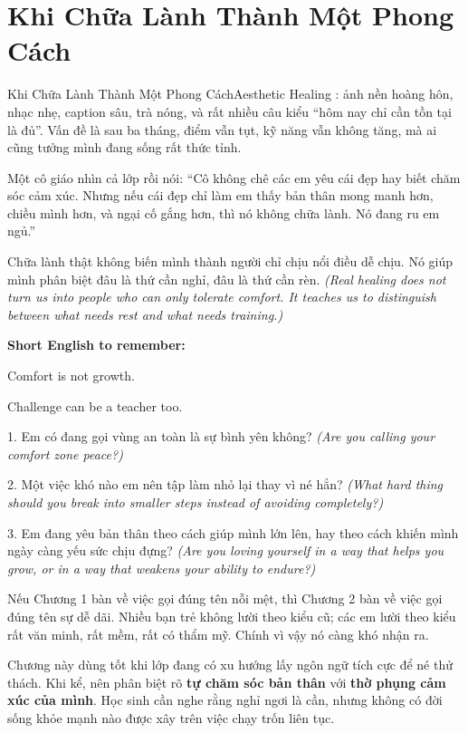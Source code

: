 \section{Khi Chữa Lành Thành Một Phong Cách}
\begin{truyen}{Khi Chữa Lành Thành Một Phong Cách}{Aesthetic Healing}
: ảnh nền hoàng hôn, nhạc nhẹ, caption sâu, trà nóng, và rất nhiều câu kiểu ``hôm nay chỉ cần tồn tại là đủ''. Vấn đề là sau ba tháng, điểm vẫn tụt, kỹ năng vẫn không tăng, mà ai cũng tưởng mình đang sống rất thức tỉnh.

Một cô giáo nhìn cả lớp rồi nói: ``Cô không chê các em yêu cái đẹp hay biết chăm sóc cảm xúc. Nhưng nếu cái đẹp chỉ làm em thấy bản thân mong manh hơn, chiều mình hơn, và ngại cố gắng hơn, thì nó không chữa lành. Nó đang ru em ngủ.''
\end{truyen}

\begin{baihoc}
Chữa lành thật không biến mình thành người chỉ chịu nổi điều dễ chịu. Nó giúp mình phân biệt đâu là thứ cần nghỉ, đâu là thứ cần rèn.
\textit{(Real healing does not turn us into people who can only tolerate comfort. It teaches us to distinguish between what needs rest and what needs training.)}
\end{baihoc}

\begin{ghinhoanh}
\textbf{Short English to remember:}

Comfort is not growth.

Challenge can be a teacher too.
\end{ghinhoanh}

\begin{tuhocnhanh}
1. Em có đang gọi vùng an toàn là sự bình yên không? \textit{(Are you calling your comfort zone peace?)}

2. Một việc khó nào em nên tập làm nhỏ lại thay vì né hẳn? \textit{(What hard thing should you break into smaller steps instead of avoiding completely?)}

3. Em đang yêu bản thân theo cách giúp mình lớn lên, hay theo cách khiến mình ngày càng yếu sức chịu đựng? \textit{(Are you loving yourself in a way that helps you grow, or in a way that weakens your ability to endure?)}
\end{tuhocnhanh}

\begin{tongketchuong}
Nếu Chương 1 bàn về việc gọi đúng tên nỗi mệt, thì Chương 2 bàn về việc gọi đúng tên sự dễ dãi. Nhiều bạn trẻ không lười theo kiểu cũ; các em lười theo kiểu rất văn minh, rất mềm, rất có thẩm mỹ. Chính vì vậy nó càng khó nhận ra.
\end{tongketchuong}

\begin{goigiaovien}
Chương này dùng tốt khi lớp đang có xu hướng lấy ngôn ngữ tích cực để né thử thách. Khi kể, nên phân biệt rõ \textbf{tự chăm sóc bản thân} với \textbf{thờ phụng cảm xúc của mình}. Học sinh cần nghe rằng nghỉ ngơi là cần, nhưng không có đời sống khỏe mạnh nào được xây trên việc chạy trốn liên tục.
\end{goigiaovien}

\ngancach